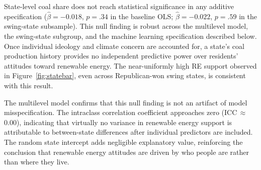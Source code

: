 \documentclass[9pt,twoside]{pnas-new}
\begin{document}
State-level coal share does not reach statistical significance in any additive
specification ($\hat{\beta} = -0.018$, $p = .34$ in the baseline OLS;
$\hat{\beta} = -0.022$, $p = .59$ in the swing-state subsample). This null
finding is robust across the multilevel model, the swing-state subgroup, and
the machine learning specification described below. Once individual ideology
and climate concern are accounted for, a state's coal production history
provides no independent predictive power over residents' attitudes toward
renewable energy. The near-uniformly high RE support observed in Figure~\ref{fig:statebar},
even across Republican-won swing states, is consistent with this result.

The multilevel model confirms that this null finding is not an artifact of
model misspecification. The intraclass correlation coefficient approaches zero
(ICC\,$\approx$\,0.00), indicating that virtually no variance in renewable energy
support is attributable to between-state differences after individual predictors
are included. The random state intercept adds negligible explanatory value,
reinforcing the conclusion that renewable energy attitudes are driven by who
people are rather than where they live.
\end{document}

